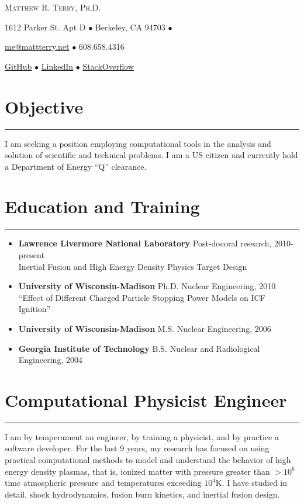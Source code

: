 \documentclass[letterpaper,11pt]{article}
\def\name{Matthew R. Terry, Ph.D.}
\newcommand{\sectionline}{\vspace{-0.05in}\hrule\vspace{0.05in}}
\begin{document}
\begin{center}
	{\huge\scshape \name}

	1612 Parker St. Apt D $\bullet$
	Berkeley, CA 94703 $\bullet$

	\href{mailto:me@mattterry.net}{me@mattterry.net}  $\bullet$
	608.658.4316

	\hyperref[https://github.com/mrterry]{GitHub}  $\bullet$
	\hyperref[http://www.linkedin.com/pub/matt-terry/a/758/61b/]{LinkedIn} $\bullet$
	\hyperref[http://careers.stackoverflow.com/cv/edit/178262]{StackOverflow}
\end{center}

\section*{Objective}
\sectionline
I am seeking a position employing computational tools in the analysis and
solution of scientific and technical problems.  I am a US citizen and currently
hold a Department of Energy ``Q'' clearance.

\section*{Education and Training}
\sectionline
\begin{itemize}
	\item
		\textbf{Lawrence Livermore National Laboratory} Post-docoral research, 2010-present \\
		Inertial Fusion and High Energy Density Physics Target Design
	\item 
		\textbf{University of Wisconsin-Madison} Ph.D. Nuclear Engineering, 2010 \\
		``Effect of Different Charged Particle Stopping Power Models on ICF Ignition''
	\item 
		\textbf{University of Wisconsin-Madison} M.S. Nuclear Engineering, 2006
	\item 
		\textbf{Georgia Institute of Technology} B.S. Nuclear and Radiological Engineering, 2004
\end{itemize}



\section*{Computational Physicist Engineer}
\sectionline
I am by temperament an engineer, by training a physicist, and by practice a
software developer.  For the last 9 years, my research has focused on using
practical
computational methods to model and understand the behavior of high energy
density plasmas, that is, ionized matter with pressure greater than $>10^6$ time atmospheric
pressure and temperatures exceeding $10^4$K.  I have studied in detail, shock hydrodynamics,
fusion burn kinetics, and inertial fusion design.
\end{document}
